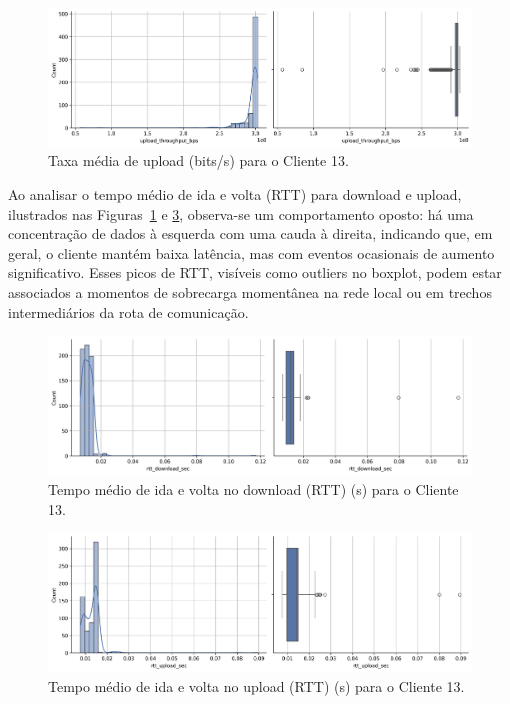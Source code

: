 \documentclass{article}
\begin{document}
\begin{figure}[htp]
	\includegraphics[width=\textwidth]{../figures/eda/chart_upload_throughput_bps_client13.png}
	\caption{Taxa média de upload (bits/s) para o Cliente 13.}
	\label{fig:chart_rtt_download_sec_client13}
\end{figure}

Ao analisar o tempo médio de ida e volta (RTT) para download e upload, ilustrados nas Figuras~\ref{fig:chart_rtt_download_sec_client13} e \ref{fig:chart_rtt_upload_sec_client13}, observa-se um comportamento oposto: há uma concentração de dados à esquerda com uma cauda à direita, indicando que, em geral, o cliente mantém baixa latência, mas com eventos ocasionais de aumento significativo.  
Esses picos de RTT, visíveis como outliers no boxplot, podem estar associados a momentos de sobrecarga momentânea na rede local ou em trechos intermediários da rota de comunicação.

\begin{figure}[H]
	\includegraphics[width=\textwidth]{../figures/eda/chart_rtt_download_sec_client13.png}
	\caption{Tempo médio de ida e volta no download (RTT) (s) para o Cliente 13.}
	\label{fig:chart_upload_throughput_bps_client13}
\end{figure}

\begin{figure}[H]
	\includegraphics[width=\textwidth]{../figures/eda/chart_rtt_upload_sec_client13.png}
	\caption{Tempo médio de ida e volta no upload (RTT) (s) para o Cliente 13.}
	\label{fig:chart_rtt_upload_sec_client13}
\end{figure}
\end{document}
